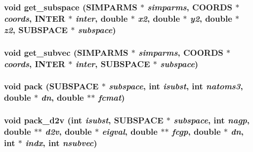\subsubsection{\setlength{\rightskip}{0pt plus 5cm}void get\_\-subspace ({\bf SIMPARMS} $\ast$ {\em simparms}, {\bf COORDS} $\ast$ {\em coords}, {\bf INTER} $\ast$ {\em inter}, double $\ast$ {\em x2}, double $\ast$ {\em y2}, double $\ast$ {\em z2}, {\bf SUBSPACE} $\ast$ {\em subspace})}\label{md__subspace_8c_b0678584afed96ebae043058b94dc0c3}


\subsubsection{\setlength{\rightskip}{0pt plus 5cm}void get\_\-subvec ({\bf SIMPARMS} $\ast$ {\em simparms}, {\bf COORDS} $\ast$ {\em coords}, {\bf INTER} $\ast$ {\em inter}, {\bf SUBSPACE} $\ast$ {\em subspace})}\label{md__subspace_8c_befd2583083e4aed4d2697b276ee449e}


\subsubsection{\setlength{\rightskip}{0pt plus 5cm}void pack ({\bf SUBSPACE} $\ast$ {\em subspace}, int {\em isubst}, int {\em natoms3}, double $\ast$ {\em dn}, double $\ast$$\ast$ {\em fcmat})}\label{md__subspace_8c_2954bdb807765fbbd9f9c0e63cb1372d}


\subsubsection{\setlength{\rightskip}{0pt plus 5cm}void pack\_\-d2v (int {\em isubst}, {\bf SUBSPACE} $\ast$ {\em subspace}, int {\em nagp}, double $\ast$$\ast$ {\em d2v}, double $\ast$ {\em eigval}, double $\ast$$\ast$ {\em fcgp}, double $\ast$ {\em dn}, int $\ast$ {\em indx}, int {\em nsubvec})}\label{md__subspace_8c_239869890976ea82c48da461aecdb275}


